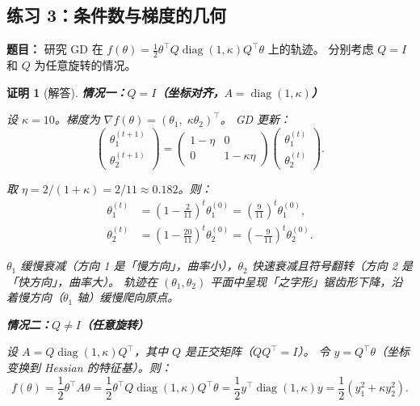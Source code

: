 \documentclass[12pt,a4paper]{ctexart}
\theoremstyle{definition}
\theoremstyle{plain}
\newtheorem*{proof*}{证明}
\newcommand{\diag}{\operatorname{diag}}
\newcommand{\grad}{\nabla}
\begin{document}
\subsection{练习 3：条件数与梯度的几何}

\textbf{题目：} 研究 GD 在 $f(\theta) = \frac12\theta^\top Q\diag(1,\kappa)Q^\top\theta$ 上的轨迹。
分别考虑 $Q=I$ 和 $Q$ 为任意旋转的情况。

\begin{proof*}[解答]

\noindent\textbf{情况一：$Q=I$（坐标对齐，$A = \diag(1, \kappa)$）}

设 $\kappa = 10$。梯度为 $\grad f(\theta) = (\theta_1,\; \kappa\theta_2)^\top$。
GD 更新：
\begin{equation}
  \begin{pmatrix}\theta_1^{(t+1)} \\ \theta_2^{(t+1)}\end{pmatrix}
  = \begin{pmatrix}1 - \eta & 0 \\ 0 & 1 - \kappa\eta\end{pmatrix}
  \begin{pmatrix}\theta_1^{(t)} \\ \theta_2^{(t)}\end{pmatrix}.
\end{equation}

取 $\eta = 2/(1+\kappa) = 2/11 \approx 0.182$。则：
\begin{align}
  \theta_1^{(t)} &= \left(1 - \frac{2}{11}\right)^t \theta_1^{(0)}
  = \left(\frac{9}{11}\right)^t \theta_1^{(0)}, \\[4pt]
  \theta_2^{(t)} &= \left(1 - \frac{20}{11}\right)^t \theta_2^{(0)}
  = \left(-\frac{9}{11}\right)^t \theta_2^{(0)}.
\end{align}

$\theta_1$ 缓慢衰减（方向 1 是「慢方向」，曲率小），$\theta_2$ 快速衰减且符号翻转（方向 2 是「快方向」，曲率大）。
轨迹在 $(\theta_1,\theta_2)$ 平面中呈现「之字形」锯齿形下降，沿着慢方向（$\theta_1$ 轴）缓慢爬向原点。

\medskip
\noindent\textbf{情况二：$Q \neq I$（任意旋转）}

设 $A = Q\diag(1,\kappa)Q^\top$，其中 $Q$ 是正交矩阵（$QQ^\top = I$）。
令 $y = Q^\top\theta$（坐标变换到 Hessian 的特征基）。则：
\begin{equation}
  f(\theta) = \frac12\theta^\top A\theta
  = \frac12\theta^\top Q\diag(1,\kappa)Q^\top\theta
  = \frac12 y^\top \diag(1,\kappa) y = \frac12(y_1^2 + \kappa y_2^2).
\end{equation}


\end{proof*}
\end{document}
